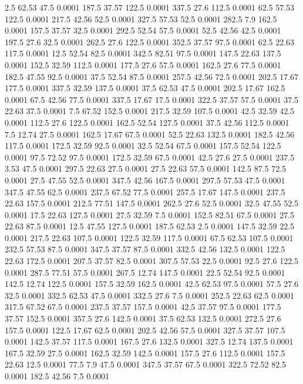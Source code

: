 2.5	62.53	47.5	0.0001
187.5	37.57	122.5	0.0001
337.5	27.6	112.5	0.0001
62.5	57.53	122.5	0.0001
217.5	42.56	52.5	0.0001
327.5	57.53	52.5	0.0001
282.5	7.9	162.5	0.0001
157.5	37.57	32.5	0.0001
292.5	52.54	57.5	0.0001
52.5	42.56	42.5	0.0001
197.5	27.6	32.5	0.0001
262.5	27.6	122.5	0.0001
352.5	37.57	97.5	0.0001
62.5	22.63	117.5	0.0001
12.5	52.54	82.5	0.0001
342.5	82.51	97.5	0.0001
147.5	22.63	137.5	0.0001
152.5	32.59	112.5	0.0001
177.5	27.6	57.5	0.0001
162.5	27.6	77.5	0.0001
182.5	47.55	92.5	0.0001
37.5	52.54	87.5	0.0001
257.5	42.56	72.5	0.0001
202.5	17.67	177.5	0.0001
337.5	32.59	137.5	0.0001
37.5	62.53	47.5	0.0001
202.5	17.67	162.5	0.0001
67.5	42.56	77.5	0.0001
337.5	17.67	17.5	0.0001
322.5	37.57	57.5	0.0001
37.5	22.63	37.5	0.0001
7.5	67.52	152.5	0.0001
217.5	32.59	107.5	0.0001
42.5	32.59	42.5	0.0001
112.5	27.6	122.5	0.0001
162.5	52.54	127.5	0.0001
37.5	42.56	112.5	0.0001
7.5	12.74	27.5	0.0001
162.5	17.67	67.5	0.0001
52.5	22.63	132.5	0.0001
182.5	42.56	117.5	0.0001
172.5	32.59	92.5	0.0001
32.5	52.54	67.5	0.0001
157.5	52.54	122.5	0.0001
97.5	72.52	97.5	0.0001
172.5	32.59	67.5	0.0001
42.5	27.6	27.5	0.0001
237.5	3.53	47.5	0.0001
297.5	22.63	27.5	0.0001
27.5	22.63	57.5	0.0001
142.5	87.5	72.5	0.0001
27.5	47.55	52.5	0.0001
347.5	42.56	167.5	0.0001
297.5	57.53	47.5	0.0001
347.5	47.55	62.5	0.0001
237.5	67.52	77.5	0.0001
257.5	17.67	147.5	0.0001
237.5	22.63	157.5	0.0001
212.5	77.51	147.5	0.0001
262.5	27.6	52.5	0.0001
32.5	47.55	52.5	0.0001
17.5	22.63	127.5	0.0001
27.5	32.59	7.5	0.0001
152.5	82.51	67.5	0.0001
27.5	22.63	87.5	0.0001
12.5	47.55	127.5	0.0001
187.5	62.53	2.5	0.0001
147.5	32.59	22.5	0.0001
217.5	22.63	107.5	0.0001
122.5	32.59	117.5	0.0001
67.5	62.53	107.5	0.0001
232.5	57.53	87.5	0.0001
347.5	37.57	87.5	0.0001
332.5	42.56	132.5	0.0001
122.5	22.63	172.5	0.0001
207.5	37.57	82.5	0.0001
307.5	57.53	22.5	0.0001
92.5	27.6	122.5	0.0001
287.5	77.51	57.5	0.0001
267.5	12.74	147.5	0.0001
22.5	52.54	92.5	0.0001
142.5	12.74	122.5	0.0001
157.5	32.59	162.5	0.0001
42.5	62.53	97.5	0.0001
57.5	27.6	32.5	0.0001
332.5	62.53	47.5	0.0001
332.5	27.6	7.5	0.0001
252.5	22.63	62.5	0.0001
317.5	67.52	67.5	0.0001
237.5	37.57	157.5	0.0001
42.5	37.57	97.5	0.0001
177.5	37.57	152.5	0.0001
357.5	27.6	142.5	0.0001
37.5	62.53	132.5	0.0001
272.5	27.6	157.5	0.0001
122.5	17.67	62.5	0.0001
202.5	42.56	57.5	0.0001
327.5	37.57	107.5	0.0001
142.5	37.57	117.5	0.0001
167.5	27.6	132.5	0.0001
327.5	12.74	137.5	0.0001
167.5	32.59	27.5	0.0001
162.5	32.59	142.5	0.0001
157.5	27.6	112.5	0.0001
157.5	22.63	12.5	0.0001
77.5	7.9	47.5	0.0001
347.5	37.57	67.5	0.0001
322.5	72.52	82.5	0.0001
182.5	42.56	7.5	0.0001
